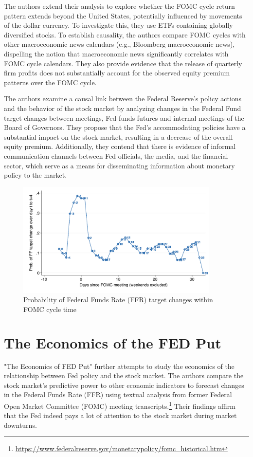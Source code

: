 The authors extend their analysis to explore whether the FOMC cycle return pattern extends beyond the United States, potentially influenced by movements of the dollar currency. To investigate this, they use ETFs containing globally diversified stocks. To establish causality, the authors compare FOMC cycles with other macroeconomic news calendars (e.g., Bloomberg macroeconomic news), dispelling the notion that macroeconomic news significantly correlates with FOMC cycle calendars. They also provide evidence that the release of quarterly firm profits does not substantially account for the observed equity premium patterns over the FOMC cycle.

The authors examine a causal link between the Federal Reserve's policy actions and the behavior of the stock market by analyzing changes in the Federal Fund target changes between meetings,  Fed funds futures and internal meetings of the Board of Governors. They propose that the Fed's accommodating policies have a substantial impact on the stock market, resulting in a decrease of the overall equity premium.  Additionally, they contend that there is evidence of informal communication channels between Fed officials, the media, and the financial sector, which serve as a means for disseminating information about monetary policy to the market.

\begin{figure}[h]
    \centering
    \label{cies19_fig3A}
    \includegraphics[width=0.9\textwidth]{figures/cies19/fig3A}
    \caption{Probability of Federal Funds Rate (FFR) target changes within FOMC cycle time \parencite{cieslak_stock_2019} }
\end{figure}

\pagebreak

\section{The Economics of the FED Put}
"The Economics of FED Put" \parencite{cieslak_economics_2021} further attempts to study the economics of the relationship between Fed policy and the stock market. The authors compare the stock market's predictive power to other economic indicators to forecast changes in the Federal Funds Rate (FFR) using textual analysis from former Federal Open Market Committee (FOMC) meeting transcripts.\footnote{\url{https://www.federalreserve.gov/monetarypolicy/fomc_historical.htm}} Their findings affirm that the Fed indeed pays a lot of attention to the stock market during market downturns.

